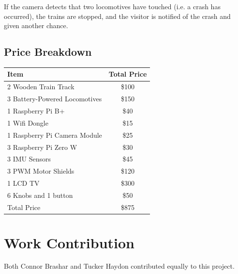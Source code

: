 \documentclass[12pt,onecolumn,reqno]{amsart}
\begin{document}
If the camera detects that two locomotives have touched (i.e. a crash has
occurred), the trains are stopped, and the visitor is notified of the crash and
given another chance.


\subsection{Price Breakdown}
\begin{center}
  \begin{tabular} { || l c || }
    \hline
    Item & Total Price \\ [0.5ex] 
    \hline\hline
    2 Wooden Train Track          & \$100 \\
    3 Battery-Powered Locomotives & \$150 \\
    1 Raspberry Pi B+             & \$40  \\
    1 Wifi Dongle                 & \$15  \\
    1 Raspberry Pi Camera Module  & \$25  \\
    3 Raspberry Pi Zero W         & \$30  \\
    3 IMU Sensors                 & \$45  \\
    3 PWM Motor Shields           & \$120  \\
    1 LCD TV                      & \$300 \\ 
    6 Knobs and 1 button          & \$50  \\
    \hline
    Total Price                   & \$875 \\
    \hline
  \end{tabular}
\end{center}

\section{Work Contribution}
Both Connor Brashar and Tucker Haydon contributed equally to this project.




\end{document}
